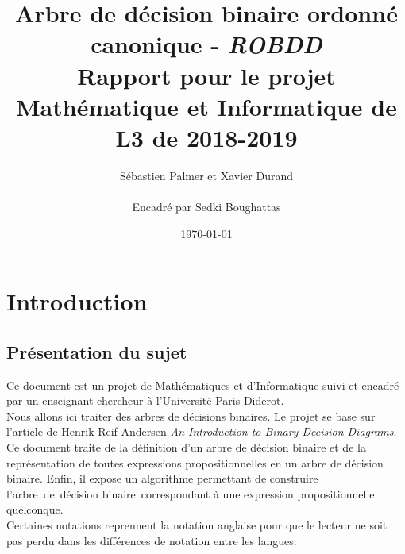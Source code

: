 \documentclass[a4paper, oneside]{report}
\newcommand{\adb}{arbre~de~décision binaire~}
\begin{document}
\posttitle{\end{center}}

\title{Arbre de décision binaire ordonné canonique - \textit{ROBDD} \\ Rapport pour le projet Mathématique et Informatique de L3 de 2018-2019  }
\date{\today}
\author{Sébastien Palmer et Xavier Durand \\~\\ Encadré par Sedki Boughattas }
\maketitle


\tableofcontents{}

\newpage

\chapter*{Introduction}

\section*{Présentation du sujet}
Ce document est un projet de Mathématiques et d'Informatique suivi et encadré par un enseignant chercheur à l'Université Paris Diderot.\\
Nous allons ici traiter des arbres de décisions binaires. Le projet se base sur l'article de Henrik Reif Andersen \og\textit{An Introduction to Binary Decision Diagrams}\fg{}.\\
Ce document traite de la définition d'un arbre de décision binaire et de la représentation de toutes expressions propositionnelles en un arbre de décision binaire. Enfin, il expose un algorithme permettant de construire l'\adb correspondant à une expression propositionnelle quelconque.\\
Certaines notations reprennent la notation anglaise pour que le lecteur ne soit pas perdu dans les différences de notation entre les langues.
\end{document}
